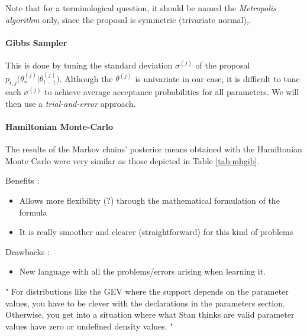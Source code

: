 Note that for a terminological question, it should be named the \emph{Metropolis algorithm} only, since the proposal is symmetric (trivariate normal),.

\paragraph*{Gibbs Sampler}

This is done by tuning the standard deviation $\sigma^{(j)}$ of the proposal $p_{t,j}\big(\theta_*^{(j)}|\theta_{t-1}^{(j)}\big)$. Although the $\theta^{(j)}$ is univariate in our case, it is difficult to tune each $\sigma^{(j)}$ to achieve average acceptance probabilities for all parameters. We will then use a \emph{trial-and-error} approach.



\paragraph*{Hamiltonian Monte-Carlo}

The results of the Markov chains' posterior means obtained with the Hamiltonian Monte Carlo were very similar as those depicted in Table \ref{tab:mhgib}.

 Benefits : 
 
 \begin{itemize}
 	\item Allows more flexibility (?) through the mathematical formulation of the formula
 	\item It is really smoother and clearer (straightforward) for this kind of problems 
 \end{itemize}
 
 Drawbacks : 
 
 \begin{itemize}
 	\item New language with all the problems/errors arising when learning it. 
 \end{itemize}
 
 
 " For distributions like the GEV where the support depends on the parameter values, you have to be clever with the declarations in the parameters section. Otherwise, you get into a situation where what Stan thinks are valid parameter values have zero or undefined density values.  "
 
